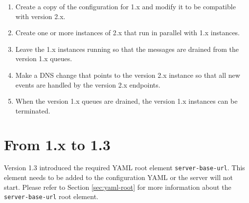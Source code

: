 \begin{enumerate}
  \item Create a copy of the \cxoneflow configuration for 1.x and modify it to be compatible with version 2.x.
  \item Create one or more instances of \cxoneflow 2.x that run in parallel with \cxoneflow 1.x instances.
  \item Leave the \cxoneflow 1.x instances running so that the messages are drained from the version 1.x queues.
  \item Make a DNS change that points to the version 2.x \cxoneflow instance so that all new events are handled by
  the version 2.x endpoints.
  \item When the version 1.x queues are drained, the \cxoneflow version 1.x instances can be terminated.
\end{enumerate}



\section{From 1.x to 1.3}

Version 1.3 introduced the required YAML root element \texttt{server-base-url}.  This element needs to be added to the configuration YAML
or the \cxoneflow server will not start.  Please refer to Section \ref{sec:yaml-root} for more information about
the \texttt{server-base-url} root element.
